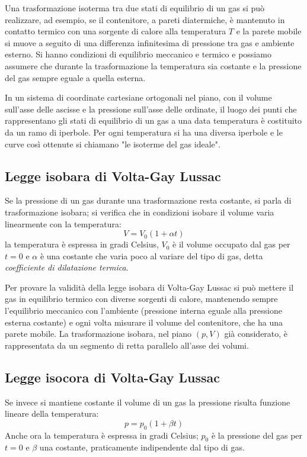 \documentclass[class=book, crop=false, oneside, 12pt]{standalone}
\begin{document}
Una trasformazione isoterma tra due stati di equilibrio di un gas si può realizzare, ad esempio, se il contenitore, a pareti diatermiche, è  mantenuto in contatto termico con una sorgente di calore alla temperatura \(T\) e la parete mobile si muove a seguito di una differenza infinitesima di pressione tra gas e ambiente esterno. 
Si hanno condizioni di equilibrio meccanico e termico e possiamo assumere che durante la trasformazione la temperatura sia costante e la pressione del gas sempre eguale a quella esterna.

In un sistema di coordinate cartesiane ortogonali nel piano, con il volume sull'asse delle ascisse e la pressione sull'asse delle ordinate, il luogo dei punti che rappresentano gli stati di equilibrio di un gas a una data temperatura è costituito da un ramo di iperbole.
Per ogni temperatura si ha una diversa iperbole e le curve così ottenute si chiamano "le isoterme del gas ideale". 

\subsection{Legge isobara di Volta-Gay Lussac}

Se la pressione di un gas durante una trasformazione resta costante, si parla di trasformazione isobara; si verifica che in condizioni isobare il volume varia linearmente con la temperatura:
\begin{equation}
    V = V_0 (1 + \alpha t)
\end{equation}
la temperatura è espressa in gradi Celsius, \(V_0\) è il volume occupato dal gas per \(t=0\) e \(\alpha\) è una costante che varia poco al variare del tipo di gas, detta \emph{coefficiente di dilatazione termica}.

Per provare la validità della legge isobara di Volta-Gay Lussac si può mettere il gas in equilibrio termico con diverse sorgenti di calore, mantenendo sempre l'equilibrio meccanico con l'ambiente (pressione interna eguale alla pressione esterna costante) e ogni volta misurare il volume del contenitore, che ha una parete mobile. 
La trasformazione isobara, nel piano \(( p, V )\) già considerato, è rappresentata da un segmento di retta parallelo all'asse dei volumi.

\subsection{Legge isocora di Volta-Gay Lussac}

Se invece si mantiene costante il volume di un gas la pressione risulta funzione lineare della temperatura:
\begin{equation}
    p = p_0 (1 + \beta t)
\end{equation}
Anche ora la temperatura è espressa in gradi Celsius; \(p_0\) è la pressione del gas per \(t = 0\) e \(\beta\) una costante, praticamente indipendente dal tipo di gas.
\end{document}
